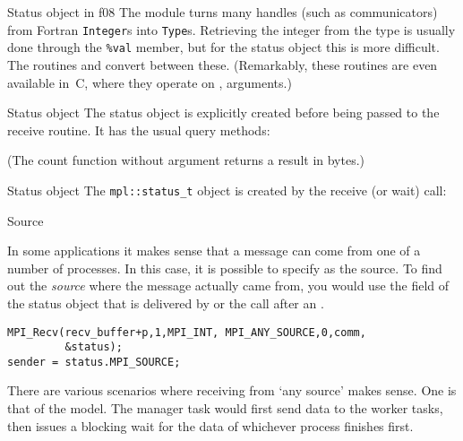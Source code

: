 \begin{fortrannote}{Status object in f08}
  \label{f:status-object}
  The  module turns many handles
  (such as communicators)
  from Fortran \lstinline{Integer}s into \lstinline{Type}s.
  Retrieving the integer from the type is usually done
  through the \lstinline+%val+ member,
  but for the status object this is more difficult.
  The routines  and 
  convert between these.
  (Remarkably, these routines are even available in~C,
  where they operate on ,  arguments.)
\end{fortrannote}

\begin{pythonnote}{Status object}
  The status object is explicitly created before being passed
  to the receive routine. It has the usual query methods:

  (The count function without argument returns a result in bytes.)
\end{pythonnote}

\begin{mplnote}{Status object}
  The \lstinline+mpl::status_t+ object is created by the receive
  (or wait) call:
\end{mplnote}

 {Source}
\label{sec:mpi-source}

In some applications it makes sense that a message can come from 
one of a number of processes. In this case, it is possible to specify
 as the source.
%
To find out the \emph{source}
where the message actually came from,
you would use the  field of the status object
that is delivered by 
or the  call after an .
\begin{lstlisting}
MPI_Recv(recv_buffer+p,1,MPI_INT, MPI_ANY_SOURCE,0,comm,
         &status);
sender = status.MPI_SOURCE;
\end{lstlisting}

There are various scenarios where receiving from `any source' makes sense.
One is that of the  model. The manager task would first send
data to the worker tasks, then issues a blocking wait for the data of whichever process
finishes first.


